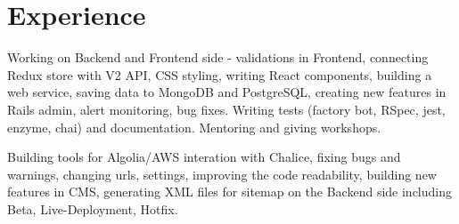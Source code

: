 \documentclass[letterpaper]{deedy-resume} %
\begin{document}
\hfill
%
%
\begin{minipage}[t]{0.66\textwidth} %


\section{Experience}


Working on Backend and Frontend side - validations in Frontend, connecting Redux store with V2 API, CSS styling, writing React components, building a web service, saving data to MongoDB and PostgreSQL, creating new features in Rails admin, alert monitoring, bug fixes.
Writing tests (factory bot, RSpec, jest, enzyme, chai) and documentation.
Mentoring and giving workshops. \\
\fontawesome\faWrench\hspace{0.2mm} 

\sectionspace %
\sectionspace %



Building tools for Algolia/AWS interation with Chalice, fixing bugs and warnings, changing urls, settings, improving the code readability, building new features in CMS, generating XML files for sitemap on the Backend side including Beta, Live-Deployment, Hotfix. \\
\fontawesome\faWrench\hspace{0.2mm} 

\sectionspace %
\sectionspace %



\end{minipage}
\end{document}

